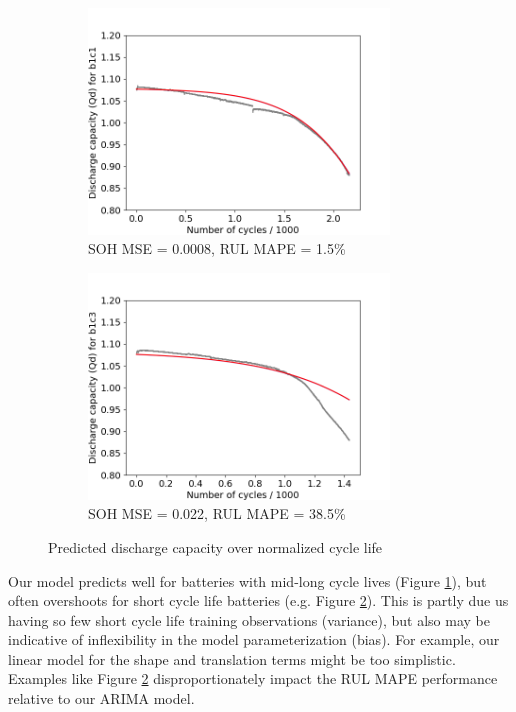 \documentclass{article}
\begin{document}
    \begin{figure}[H]
        \centering
        \begin{subfigure}[b]{0.49\linewidth}
            \includegraphics[height=6cm,width=\linewidth]{figs/bayes_plot_with_error_b1c1.png}
            \caption{SOH MSE = 0.0008, RUL MAPE = 1.5\%}
            \label{fig:bayessub1}
        \end{subfigure}
        \begin{subfigure}[b]{0.49\linewidth}
            \includegraphics[height=6cm,width=\linewidth]{figs/bayes_plot_with_error_train_b1c3.png}
            \caption{SOH MSE = 0.022, RUL MAPE = 38.5\%}
            \label{fig:bayessub2}
        \end{subfigure}
        \caption{Predicted discharge capacity over normalized cycle life}
        \label{fig:bayespred}
    \end{figure}
Our model predicts well for batteries with mid-long cycle lives (Figure \ref{fig:bayessub1}), but often overshoots for short cycle life batteries (e.g. Figure \ref{fig:bayessub2}). This is partly due us having so few short cycle life training observations (variance), but also may be indicative of inflexibility in the model parameterization (bias). For example, our linear model for the shape and translation terms might be too simplistic. Examples like Figure \ref{fig:bayessub2} disproportionately impact the RUL MAPE performance relative to our ARIMA model. 
\end{document}
